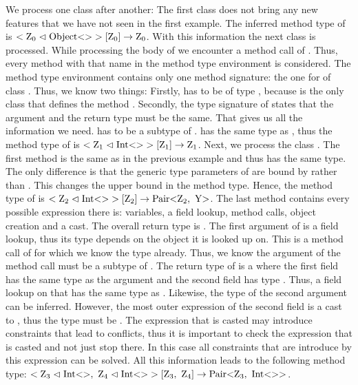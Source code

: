 We process one class after another: The first class does not bring any new features that we have not seen in the first example. The inferred method type of  is $<\text{Z}_{0} \vartriangleleft \text{Object} \text{<}  \text{>}>[\text{Z}_{0}] \to \text{Z}_{0}$.
With this information the next class  is processed. While processing the body of  we encounter a method call of . Thus, every method with that name in the method type environment is considered. The method type environment
contains only one method signature: the one for  of class . Thus, we know two things: Firstly,  has to be of type , because  is the only class that defines the method . Secondly, the type signature of  states that the argument and the return type must be the same.
That gives us all the information we need.  has to be a subtype of .  has the same type as , thus the method type of  is $<\text{Z}_{1} \vartriangleleft \text{Int} \text{<}  \text{>}>[\text{Z}_{1}] \to \text{Z}_{1}$.
Next, we process the class . The first method  is the same as in the previous example and thus has the same type. The only difference is that the generic type parameters of  are bound by  rather than .
This changes the upper bound in the method type. Hence, the method type of  is $<\xa{Z}{2} \vartriangleleft \nvtt{Int}{}>[\xa{Z}{2}] \to \nvtt{Pair}{\xa{Z}{2}, \ \text{Y}}$.
The last method  contains every possible expression there is: variables, a field lookup, method calls, object creation and a cast.
The overall return type is . The first argument of  is a field lookup, thus its type depends on the object it is looked up on. This is a method call of  for which we know the type already. Thus, we know the argument  of the method call  must be a subtype of . The return type of  is a  where the first field has the same type as the argument  and the second field has type .
Thus, a field lookup  on that  has the same type as . Likewise, the type of the second argument can be inferred. However, the most outer expression of the second field is a cast to , thus the type must be .
The expression that is casted may introduce constraints that lead to conflicts, thus it is important to check the expression that is casted and not just stop there. In this case all constraints that are introduce by this expression can be solved.
All this information leads to the following method type: $<\xa{Z}{3} \vartriangleleft \nvtt{Int}{}, \ \xa{Z}{4} \vartriangleleft \nvtt{Int}{}>[\xa{Z}{3}, \ \xa{Z}{4}] \to \nvtt{Pair}{\xa{Z}{3}, \ \nvtt{Int}{}}$.
